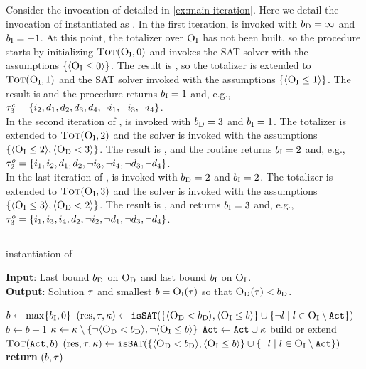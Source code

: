 \begin{example}
  Consider the invocation of \algname{} detailed in \cref{ex:main-iteration}. 
  Here we detail the invocation of \Min{} instantiated as \unsatsat{}.
  In the first iteration, \unsatsat{} is invoked with $b_{\text{D}} = \infty$ and $b_{\text{I}}=-1$.
  At this point, the totalizer over $\textsc{O}_{\text{I}}$ has not been built, so the procedure starts by initializing $\textsc{Tot}(\textsc{O}_{\text{I}}, 0)$ and invokes the SAT solver with the assumptions $\{\langle \textsc{O}_{\text{I}} \leq 0 \rangle\}$.
  The result is \unsat{}, so the totalizer is extended to $\textsc{Tot}(\textsc{O}_{\text{I}}, 1)$ and the SAT solver invoked with the assumptions $\{ \langle \textsc{O}_{\text{I}} \leq 1 \rangle\}$.
  The result is \sat{} and the procedure returns $b_{\text{I}} = 1$ and, e.g., $\tau^c_3 = \{i_2,\allowbreak d_1,\allowbreak d_2,\allowbreak d_3,\allowbreak d_4,\allowbreak \lnot i_1,\allowbreak \lnot i_3,\allowbreak \lnot i_4\}$. \\
  In the second iteration of \algname{}, \unsatsat{} is invoked with $b_{\text{D}} = 3$ and $b_{\text{I}} = 1$.
  The totalizer is extended to $\textsc{Tot}(\textsc{O}_{\text{I}}, 2)$ and the solver is invoked with the assumptions $\{\langle \textsc{O}_{\text{I}} \leq 2 \rangle, \langle \textsc{O}_{\text{D}} < 3 \rangle\}$.
  The result is \sat{}, and the routine returns $b_{\text{I}} = 2$ and, e.g., $\tau^o_2 = \{i_1,\allowbreak i_2,\allowbreak d_1,\allowbreak d_2,\allowbreak \lnot i_3,\allowbreak \lnot i_4,\allowbreak \lnot d_3,\allowbreak \lnot d_4\}$. \\
  In the last iteration of \algname{}, \unsatsat{} is invoked with $b_{\text{D}} = 2$ and $b_{\text{I}} = 2$.
  The totalizer is extended to $\textsc{Tot}(\textsc{O}_{\text{I}}, 3)$ and the solver is invoked with the assumptions $\{\langle \textsc{O}_{\text{I}} \leq 3 \rangle, \langle \textsc{O}_{\text{D}} < 2 \rangle\}$.
  The result is \sat{}, and \unsatsat{} returns $b_{\text{I}} = 3$ and, e.g., $\tau^o_3 = \{i_1,\allowbreak i_3,\allowbreak i_4,\allowbreak d_2,\allowbreak \lnot i_2,\allowbreak \lnot d_1,\allowbreak \lnot d_3,\allowbreak \lnot d_4\}$.
\end{example}

\subsection{\msu{}\label{sec:msu}}

\begin{algorithm}[t]
  \caption{\msu{} instantiation of \Min{}}\label{alg:msu}
  \textbf{Input}: Last bound $b_{\text{D}}$ on $\textsc{O}_{\text{D}}$ and last bound $b_{\text{I}}$ on $\textsc{O}_{\text{I}}$. \\
  \textbf{Output}: Solution $\tau$ and smallest $b=\textsc{O}_{\text{I}}(\tau)$ so that $\textsc{O}_{\text{D}}(\tau)<b_{\text{D}}$.

  \begin{algorithmic}[1]
    \STATE $b \gets \max\{b_{\text{I}},0\}$
    \STATE $(\text{res},\tau,\kappa) \gets \texttt{isSAT}(\{\langle \textsc{O}_{\text{D}} < b_{\text{D}} \rangle, \langle \textsc{O}_{\text{I}} \leq b \rangle\} \cup \{\lnot l \mid l \in \textsc{O}_{\text{I}} \setminus \texttt{Act}\})$ \label{ln:msu-firstquery}
    \WHILE{$\res = \unsat$}
      \STATE $b \gets b+1$ \label{ln:msu-inc}
      \STATE $\kappa \gets \kappa \setminus \{\lnot\langle \textsc{O}_{\text{D}} < b_{\text{D}} \rangle, \lnot\langle \textsc{O}_{\text{I}} \leq b \rangle\}$
      \STATE $\texttt{Act} \gets \texttt{Act} \cup \kappa$
      \STATE build or extend $\textsc{Tot}(\texttt{Act},b)$ \label{ln:msu-tot}
      \STATE $(\text{res},\tau,\kappa) \gets \texttt{isSAT}(\{\langle \textsc{O}_{\text{D}} < b_{\text{D}} \rangle, \langle \textsc{O}_{\text{I}} \leq b \rangle\} \cup \{\lnot l \mid l \in \textsc{O}_{\text{I}} \setminus \texttt{Act}\})$ \label{ln:msu-mainquery}
    \ENDWHILE
    \STATE \textbf{return} $(b,\tau)$
  \end{algorithmic}
\end{algorithm}

